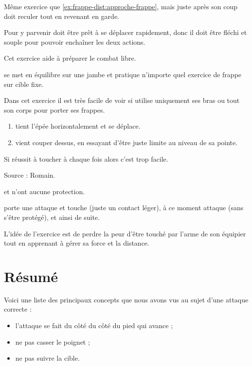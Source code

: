 \begin{exercice}
\label{ex:frappe-dist:approche-croix-aleat-garde}

Même exercice que \ref{ex:frappe-dist:approche-frappe}, mais juste après son coup \A doit reculer tout en revenant en garde.

Pour y parvenir \A doit être prêt à se déplacer rapidement, donc il doit être fléchi et souple pour pouvoir enchaîner les deux actions.

Cet exercice aide à préparer le combat libre.

\end{exercice}


\begin{exercice}
\A se met en équilibre sur une jambe et pratique n'importe quel exercice de frappe sur cible fixe.

Dans cet exercice il est très facile de voir si \A utilise uniquement ses bras ou tout son corps pour porter ses frappes.
\end{exercice}


\begin{exercice}

\begin{enumerate}
	\item \D tient l'épée horizontalement et se déplace.
	
	\item \A vient couper dessus, en essayant d'être juste limite au niveau de sa pointe.
\end{enumerate}

Si \A réussit à toucher à chaque fois alors c'est trop facile.

Source : Romain.

\end{exercice}


\begin{exercice}
\A et \D n'ont aucune protection.

\A porte une attaque et touche \D (juste un contact léger), à ce moment \D attaque \A (sans s'être protégé), et ainsi de suite.

L'idée de l'exercice est de perdre la peur d'être touché par l'arme de son équipier tout en apprenant à gérer sa force et la distance.
\end{exercice}


\section{Résumé}


\noindent
Voici une liste des principaux concepts que nous avons vus au sujet d'une attaque correcte :
\begin{itemize}
	\item l'attaque se fait du côté du côté du pied qui avance ;
	\item ne pas casser le poignet ;
	\item ne pas suivre la cible.
\end{itemize}


